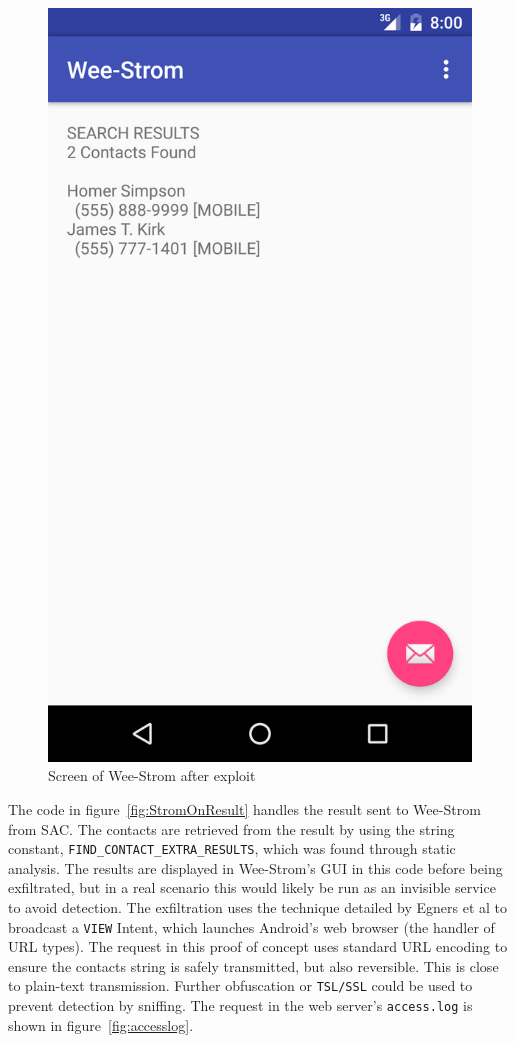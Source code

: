 \documentclass[conference,compsoc]{IEEEtran}
\begin{document}
\begin{figure}
\includegraphics[width=\columnwidth]{strom2.png}
\caption{Screen of Wee-Strom after exploit}
\label{Screenshot:WSAfter}
\end{figure}

\indent The code in figure~\ref{fig:StromOnResult} handles the result sent to Wee-Strom from SAC. The contacts are retrieved from the result by using the string constant, \texttt{FIND\_CONTACT\_EXTRA\_RESULTS}, which was found through static analysis. The results are displayed in Wee-Strom's GUI in this code before being exfiltrated, but in a real scenario this would likely be run as an invisible service to avoid detection. The exfiltration uses the technique detailed by Egners et al\cite{Egners:2012:MAP:2360018.2360209} to broadcast a \texttt{VIEW} Intent, which launches Android's web browser (the handler of URL types). The request in this proof of concept uses standard URL encoding to ensure the contacts string is safely transmitted, but also reversible. This is close to plain-text transmission. Further obfuscation or \texttt{TSL/SSL} could be used to prevent detection by sniffing. The request in the web server's \texttt{access.log} is shown in figure~\ref{fig:accesslog}.
\end{document}
